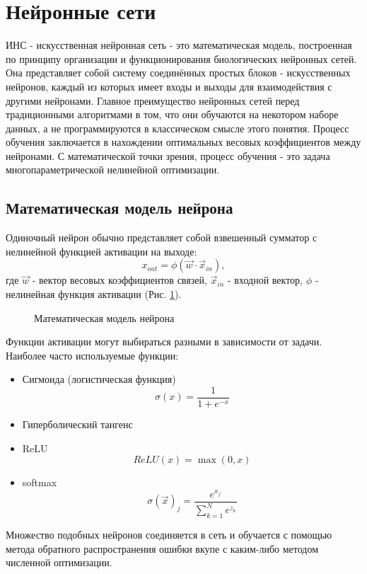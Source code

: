 \clearpage
\section{Нейронные сети}
	ИНС - искусственная нейронная сеть - это математическая модель, построенная по принципу организации и функционирования биологических нейронных сетей. Она представляет собой систему соединённых простых блоков - искусственных нейронов, каждый из которых имеет входы и выходы для взаимодействия с другими нейронами. Главное преимущество нейронных сетей перед традиционными алгоритмами в том, что они обучаются на некотором наборе данных, а не программируются в классическом смысле этого понятия. Процесс обучения заключается в нахождении оптимальных весовых коэффициентов между нейронами. С математической точки зрения, процесс обучения - это задача многопараметрической нелинейной оптимизации.
	\subsection{Математическая модель нейрона}
		Одиночный нейрон обычно представляет собой взвешенный сумматор с нелинейной функцией активации на выходе:
		$$x_{out} = \phi(\vec{w} \cdotp \vec{x}_{in}),$$
		где $\vec{w}$ - вектор весовых коэффициентов связей, $\vec{x}_{in}$ - входной вектор, $\phi$ - нелинейная функция активации (Рис. \ref{3-artificial-neuron-model}).
		
		\begin{figure}[h]
			\caption{Математическая модель нейрона}
			\label{3-artificial-neuron-model}
		\end{figure}
		
		Функции активации могут выбираться разными в зависимости от задачи. Наиболее часто используемые функции:
		
		\begin{itemize}
			\item Сигмоида (логистическая функция)
					$$\sigma(x) = \frac{1}{1 + e^{-x}}$$
			\item Гиперболический тангенс
			\item ReLU
					$$ReLU(x) = \max(0, x)$$
			\item softmax
					$$\sigma(\vec{x})_j = \frac{e^{x_j}}{\sum_{k=1}^{N} e^{z_k}}$$
		\end{itemize}
		Множество подобных нейронов соединяется в сеть и обучается с помощью метода обратного распространения ошибки вкупе с каким-либо методом численной оптимизации.

